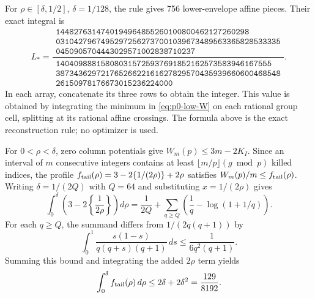 For $\rho\in[\delta,1/2]$, $\delta=1/128$, the rule gives 756 lower-envelope
affine pieces.  Their exact integral is
\begin{equation}\label{eq:p0-low-integral}
 L_*=
 \frac{\begin{array}{c}
 \texttt{1448276314740194964855260100800462127260298}\\
 \texttt{03104279674952972562737001039673489563365828533335}\\
 \texttt{0450905704443029571002838710237}
 \end{array}}
 {\begin{array}{c}
 \texttt{140409888158080315725937691852162573583946167555}\\
 \texttt{38734362972176526622161627829570435939660600468548}\\
 \texttt{26150978176673015236224000}
 \end{array}}.
\end{equation}
In each array, concatenate its three rows to obtain the integer.  This value
is obtained by integrating the minimum in \eqref{eq:p0-low-W}
on each rational group cell, splitting at its rational affine crossings.
The formula above is the exact reconstruction rule; no optimizer is used.

For $0<\rho<\delta$, zero column potentials give
$W_m(p)\le3m-2K_I$.  Since an interval of $m$ consecutive integers contains
at least $\lfloor m/p\rfloor(g\bmod p)$ killed indices, the profile
$f_{\rm tail}(\rho)=3-2\{1/(2\rho)\}+2\rho$ satisfies
$W_m(p)/m\le f_{\rm tail}(\rho)$.
Writing $\delta=1/(2Q)$ with $Q=64$ and substituting
$x=1/(2\rho)$ gives
\[
 \int_0^\delta\left(3-2\left\{\frac1{2\rho}\right\}\right)d\rho
 =\frac1{2Q}+\sum_{q\ge Q}\left(\frac1q-\log(1+1/q)\right).
\]
For each $q\ge Q$, the summand differs from $1/(2q(q+1))$ by
\[
 \int_0^1\frac{s(1-s)}{q(q+s)(q+1)}\,ds
 \le\frac1{6q^2(q+1)}.
\]
Summing this bound and integrating the added $2\rho$ term yields
\begin{equation}\label{eq:p0-small-tail}
 \int_0^\delta f_{\rm tail}(\rho)\,d\rho\le
 2\delta+2\delta^2=\frac{129}{8192}.
\end{equation}


